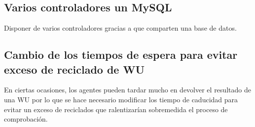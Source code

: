 \subsection{Varios controladores un MySQL}
Disponer de varios controladores gracias a que comparten una base de datos.

\subsection{Cambio de los tiempos de espera para evitar exceso de reciclado de WU}
En ciertas ocasiones, los agentes pueden tardar mucho en devolver el resultado de una WU por lo que se hace necesario modificar los tiempo de caducidad para evitar un exceso de reciclados que ralentizarían sobremedida el proceso de comprobación.